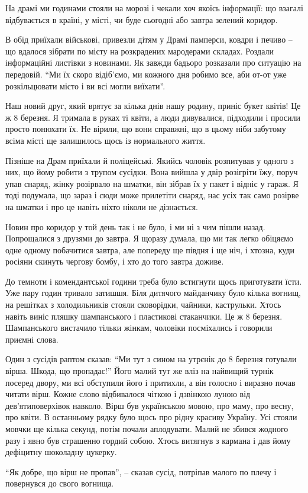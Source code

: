 На драмі ми годинами стояли на морозі і чекали хоч якоїсь інформації: що
взагалі відбувається в країні, у місті, чи буде сьогодні або завтра зелений
коридор. 

В обід приїхали військові, привезли дітям у Драмі памперси, ковдри і печиво –
що вдалося зібрати по місту на розкрадених мародерами складах. Роздали
інформаційні листівки з новинами. Як завжди бадьоро розказали про ситуацію на
передовій. \enquote{Ми їх скоро відіб'ємо, ми кожного дня робимо все, аби от-от уже
розкільцювати місто і ви всі могли виїхати}. 

Наш новий друг, який врятує за кілька днів нашу родину, приніс букет квітів! Це
ж 8 березня. Я тримала в руках ті квіти, а люди дивувалися, підходили і просили
просто понюхати їх. Не вірили, що вони справжні, що в цьому ніби забутому всіма
місті ще залишилось щось із нормального життя.

Пізніше на Драм приїхали й поліцейські. Якийсь чоловік розпитував у одного з
них, що йому робити з трупом сусідки. Вона вийшла у двір розігріти їжу, поруч
упав снаряд, жінку розірвало на шматки, він зібрав їх у пакет і відніс у гараж.
Я тоді подумала, що зараз і сюди може прилетіти снаряд, нас усіх так само
розірве на шматки і про це навіть ніхто ніколи не дізнається.


Новин про коридор у той день так і не було, і ми ні з чим пішли назад.
Попрощалися з друзями до завтра. Я щоразу думала, що ми так легко обіцяємо одне
одному побачитися завтра, але попереду ще півдня і ще ніч, і хтозна, куди
росіяни скинуть чергову бомбу, і хто до того завтра доживе. 

До темноти і комендантської години треба було встигнути щось приготувати їсти.
Уже пару годин тривало затишшя. Біля дитячого майданчику було кілька вогнищ, на
решітках з холодильників стояли сковорідки, чайники, каструльки. Хтось навіть
виніс пляшку шампанського і пластикові стаканчики. Це ж 8 березня. Шампанського
вистачило тільки жінкам, чоловіки посміхались і говорили приємні слова. 

Один з сусідів раптом сказав: \enquote{Ми тут з сином на утрєнік до 8 березня готували
вірша. Шкода, що пропадає!} Його малий тут же вліз на найвищий турнік посеред
двору, ми всі обступили його і притихли, а він голосно і виразно почав читати
вірш. Кожне слово відбивалося чіткою і дзвінкою луною від дев'ятиповерхівок
навколо. Вірш був українською мовою, про маму, про весну, про квіти. В
останньому рядку було щось про рідну красиву Україну. Усі стояли мовчки ще
кілька секунд, потім почали аплодувати. Малий не збився жодного разу і явно був
страшенно гордий собою. Хтось витягнув з кармана і дав йому дефіцитну шоколадну
цукерку. 

\enquote{Як добре, що вірш не пропав}, – сказав сусід, потріпав малого по плечу і
повернувся до свого вогнища.

